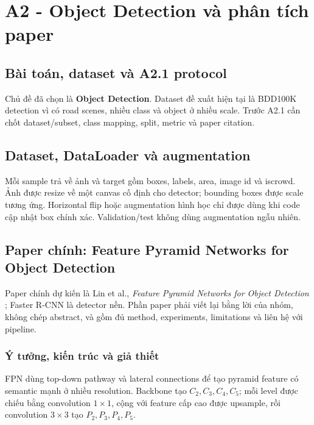 \section{A2 - Object Detection và phân tích paper}

\subsection{Bài toán, dataset và A2.1 protocol}
Chủ đề đã chọn là \textbf{Object Detection}. Dataset đề xuất hiện tại là BDD100K detection vì có road scenes, nhiều class và object ở nhiều scale. Trước A2.1 cần chốt dataset/subset, class mapping, split, metric và paper citation.


\subsection{Dataset, DataLoader và augmentation}
Mỗi sample trả về ảnh và target gồm boxes, labels, area, image id và iscrowd. Ảnh được resize về một canvas cố định cho detector; bounding boxes được scale tương ứng. Horizontal flip hoặc augmentation hình học chỉ được dùng khi code cập nhật box chính xác. Validation/test không dùng augmentation ngẫu nhiên.

\subsection{Paper chính: Feature Pyramid Networks for Object Detection}
Paper chính dự kiến là Lin et al., \emph{Feature Pyramid Networks for Object Detection} \cite{lin2017fpn}; Faster R-CNN \cite{ren2015faster} là detector nền. Phần paper phải viết lại bằng lời của nhóm, không chép abstract, và gồm đủ method, experiments, limitations và liên hệ với pipeline.

\subsubsection{Ý tưởng, kiến trúc và giả thiết}
FPN dùng top-down pathway và lateral connections để tạo pyramid feature có semantic mạnh ở nhiều resolution. Backbone tạo $C_2,C_3,C_4,C_5$; mỗi level được chiếu bằng convolution $1\times1$, cộng với feature cấp cao được upsample, rồi convolution $3\times3$ tạo $P_2,P_3,P_4,P_5$.

